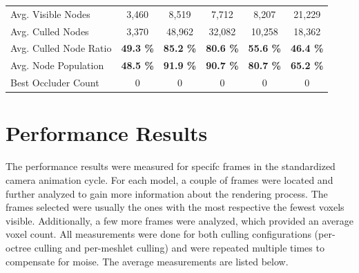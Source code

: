 \begin{table}[h]
\begin{tabular}{|lccccc|}
  \multicolumn{1}{|l|}{Avg. Visible Nodes}        & \multicolumn{1}{c|}{3,460}                    & \multicolumn{1}{c|}{8,519}                    & \multicolumn{1}{c|}{7,712}            & \multicolumn{1}{c|}{8,207}                & \multicolumn{1}{c|}{21,229}               \\
  \multicolumn{1}{|l|}{Avg. Culled Nodes}         & \multicolumn{1}{c|}{3,370}                    & \multicolumn{1}{c|}{48,962}                   & \multicolumn{1}{c|}{32,082}           & \multicolumn{1}{c|}{10,258}               & \multicolumn{1}{c|}{18,362}               \\
  \multicolumn{1}{|l|}{Avg. Culled Node Ratio}    & \multicolumn{1}{c|}{\textbf{49.3 \%}}         & \multicolumn{1}{c|}{\textbf{85.2 \%}}         & \multicolumn{1}{c|}{\textbf{80.6 \%}} & \multicolumn{1}{c|}{\textbf{55.6 \%}}     & \multicolumn{1}{c|}{\textbf{46.4 \%}}     \\ \hline
  \multicolumn{1}{|l|}{Avg. Node Population}      & \multicolumn{1}{c|}{\textbf{48.5 \%}}         & \multicolumn{1}{c|}{\textbf{91.9 \%}}         & \multicolumn{1}{c|}{\textbf{90.7 \%}} & \multicolumn{1}{c|}{\textbf{80.7 \%}}     & \multicolumn{1}{c|}{\textbf{65.2 \%}}     \\
  \multicolumn{1}{|l|}{Best Occluder Count}       & \multicolumn{1}{c|}{0}                        & \multicolumn{1}{c|}{0}                        & \multicolumn{1}{c|}{0}                & \multicolumn{1}{c|}{0}                    & \multicolumn{1}{c|}{0}                    \\ \hline
  

  \end{tabular}
\end{table}



\section{Performance Results}

The performance results were measured for specifc frames in the standardized camera animation cycle. For each 
model, a couple of frames were located and further analyzed to gain more information about the rendering 
process. The frames selected were usually the ones with the most respective the fewest voxels visible. Additionally,
a few more frames were analyzed, which provided an average voxel count. All measurements were done for both 
culling configurations (per-octree culling and per-meshlet culling) and were repeated multiple times to compensate 
for moise. The average measurements are listed below. \\

